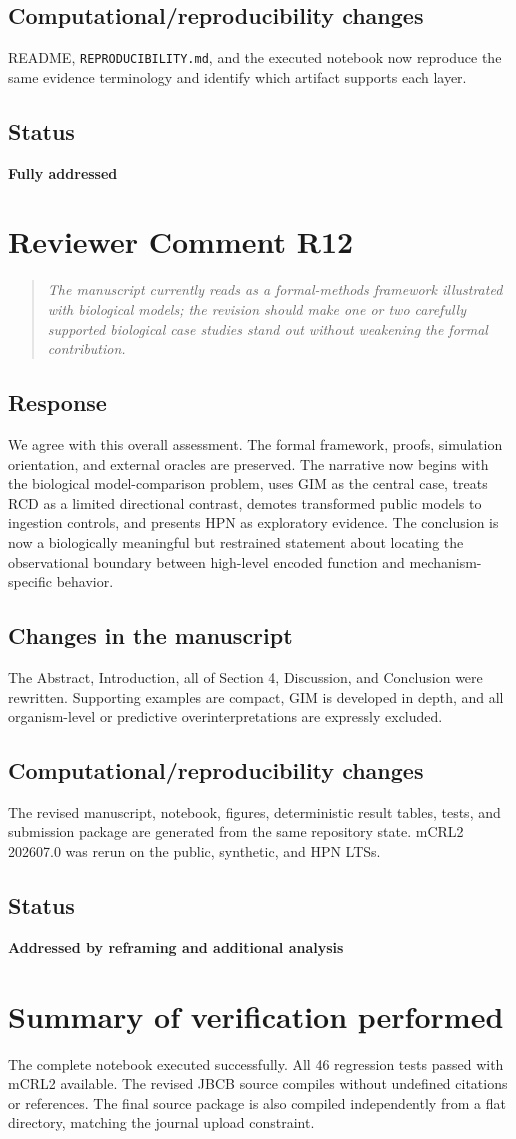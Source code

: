 \documentclass[11pt]{article}
\newcommand{\reviewcomment}[2]{%
  \section*{Reviewer Comment #1}
  \begin{quote}\itshape #2\end{quote}}
\newcommand{\response}{\subsection*{Response}}
\newcommand{\manuscriptchanges}{\subsection*{Changes in the manuscript}}
\newcommand{\computationalchanges}{\subsection*{Computational/reproducibility changes}}
\newcommand{\status}[1]{\subsection*{Status}\textbf{#1}}
\begin{document}
\computationalchanges
README, \nolinkurl{REPRODUCIBILITY.md}, and the executed notebook now reproduce the
same evidence terminology and identify which artifact supports each layer.

\status{Fully addressed}

\reviewcomment{R12}{The manuscript currently reads as a formal-methods framework
illustrated with biological models; the revision should make one or two
carefully supported biological case studies stand out without weakening the
formal contribution.}

\response
We agree with this overall assessment. The formal framework, proofs, simulation
orientation, and external oracles are preserved. The narrative now begins with
the biological model-comparison problem, uses GIM as the central case, treats
RCD as a limited directional contrast, demotes transformed public models to
ingestion controls, and presents HPN as exploratory evidence. The conclusion is
now a biologically meaningful but restrained statement about locating the
observational boundary between high-level encoded function and
mechanism-specific behavior.

\manuscriptchanges
The Abstract, Introduction, all of Section 4, Discussion, and Conclusion were
rewritten. Supporting examples are compact, GIM is developed in depth, and all
organism-level or predictive overinterpretations are expressly excluded.

\computationalchanges
The revised manuscript, notebook, figures, deterministic result tables, tests,
and submission package are generated from the same repository state. mCRL2
202607.0 was rerun on the public, synthetic, and HPN LTSs.

\status{Addressed by reframing and additional analysis}

\section*{Summary of verification performed}

The complete notebook executed successfully. All 46 regression tests passed
with mCRL2 available. The revised JBCB source compiles without undefined
citations or references. The final source package is also compiled independently
from a flat directory, matching the journal upload constraint.
\end{document}
